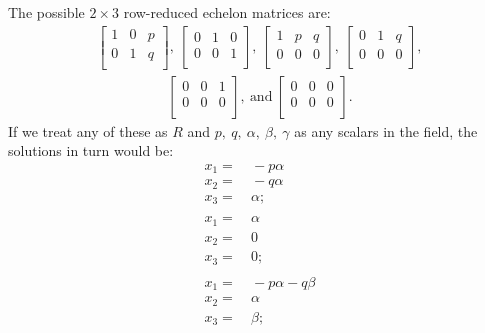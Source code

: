 \documentclass[12pt]{article}
\begin{document}
\begin{enumerate}
    The possible $2 \times 3$ row-reduced echelon matrices are:
    \begin{align*}
      \begin{bmatrix}
        1 & 0 & p\\
        0 & 1 & q\\
      \end{bmatrix},\ 
      \begin{bmatrix}
        0 & 1 & 0\\
        0 & 0 & 1\\
      \end{bmatrix},\ 
      \begin{bmatrix}
        1 & p & q\\
        0 & 0 & 0\\
      \end{bmatrix},\ 
      \begin{bmatrix}
        0 & 1 & q\\
        0 & 0 & 0\\
      \end{bmatrix},
    \end{align*}
    \begin{align*}
      \begin{bmatrix}
        0 & 0 & 1\\
        0 & 0 & 0\\
      \end{bmatrix},\ \text{and}\ 
      \begin{bmatrix}
        0 & 0 & 0\\
        0 & 0 & 0\\
      \end{bmatrix}.
    \end{align*}
    If we treat any of these as $R$ and $p,\ q,\ \alpha,\ \beta,\
    \gamma$ as any scalars in the field, the solutions in turn
    would be:
    \begin{align*}
      x_1 =&\ -p\alpha\\
      x_2 =&\ -q\alpha\\
      x_3 =&\ \alpha;\\\\
      x_1 =&\ \alpha\\
      x_2 =&\ 0\\
      x_3 =&\ 0;\\\\
      x_1 =&\ -p\alpha -q\beta\\
      x_2 =&\ \alpha\\
      x_3 =&\ \beta;\\\\

\end{align*}
\end{enumerate}
\end{document}

